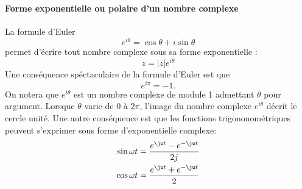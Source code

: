 \paragraph{Forme exponentielle ou polaire d'un nombre complexe}
La formule d'Euler 
$$
e^{i\theta}=\cos\theta+i\sin\theta
$$
permet d'écrire tout nombre complexe sous sa forme exponentielle : 
$$
z=|z|e^{i\theta}
$$
Une conséquence spéctaculaire de la formule d'Euler est que
$$
e^{i\pi}=-1.
$$
On notera que $e^{i\theta}$ est un nombre complexe de module 1 admettant $\theta$ pour argument.
Lorsque $\theta$ varie de $0$ à $2\pi$, l'image du nombre complexe $e^{i\theta}$ décrit 
le cercle unité.
Une autre conséquence est que les fonctions trigononométriques peuvent s'exprimer sous forme d'exponentielle 
complexe:
\begin{align*}
    \sin{\omega t}&=\dfrac{e^{\jw t}-e^{-\jw t}}{2j} \\
    \cos{\omega t}&=\dfrac{e^{\jw t}+e^{-\jw t}}{2}
\end{align*}

